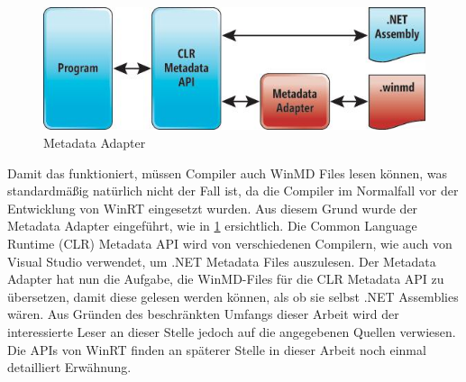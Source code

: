 \documentclass[a4paper,bibtotoc,oneside]{scrbook}
\begin{document}
\newline
\begin{figure}[htbp]
\includegraphics[scale=1]{images/farkas_winrt_clr.jpg}
\caption[The Metadata Adapter. Quelle: \cite{sfar12}]{Metadata Adapter}\label{Abb2}
\end{figure}
\newline
Damit das funktioniert, müssen Compiler auch WinMD Files lesen können, was standardmäßig natürlich nicht der Fall ist, da die Compiler im Normalfall vor der Entwicklung von WinRT eingesetzt wurden. Aus diesem Grund wurde der Metadata Adapter eingeführt, wie in \ref{Abb2} ersichtlich.
\newline
Die Common Language Runtime (CLR) Metadata API wird von verschiedenen Compilern, wie auch von Visual Studio verwendet, um .NET Metadata Files auszulesen.
Der Metadata Adapter hat nun die Aufgabe, die WinMD-Files für die CLR Metadata API zu übersetzen, damit diese gelesen werden können, als ob sie selbst .NET Assemblies wären.
\cite{sfar12}
\newline
\newline
Aus Gründen des beschränkten Umfangs dieser Arbeit wird der interessierte Leser an dieser Stelle jedoch auf die angegebenen Quellen verwiesen. Die APIs von WinRT finden an späterer Stelle in dieser Arbeit noch einmal detailliert Erwähnung.
 
\end{document}
